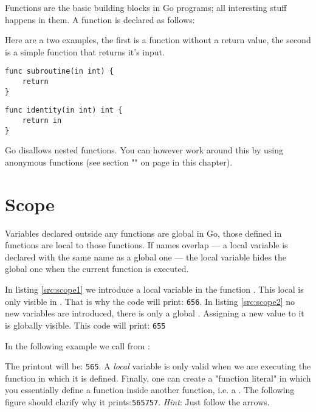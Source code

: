 
\noindent{}Functions are the basic building blocks in Go programs; all interesting
stuff happens in them. A function is declared as follows:

\showremarks
Here are a two examples, the first is a function without a return value,
the second is a simple function that returns it's input.
\begin{lstlisting}
func subroutine(in int) {
    return
}
\end{lstlisting}
\begin{lstlisting}
func identity(in int) int {
    return in
}
\end{lstlisting}
Go disallows nested functions.
You can however
work around this by using anonymous functions (see section
"" on page \pageref{sec:functions as values} 
in this chapter).

\section{Scope}
Variables declared outside any functions are global in Go, those
defined in functions are local to those functions. If names overlap --- a
local variable is declared with the same name as a global one --- the
local variable hides the global one when the current function is
executed.

\begin{minipage}{.5\textwidth}

\hfill
\vfill
\end{minipage}
\begin{minipage}{.5\textwidth}

\hfill
\vfill
\end{minipage}

In listing \ref{src:scope1} we introduce a local variable 
in the function .
This local  is only visible in . That is
why the code will print: \texttt{656}.
In listing \ref{src:scope2} no new variables are introduced, there
is only a global .
Assigning a new value to it is globally visible. This code will
print: \texttt{655}

In the following example we call  from :

The printout will be: \texttt{565}. A \emph{local} variable is only
valid when we are executing the function in which it is defined. 
Finally, one can create
a "function
literal" in which you essentially define a function inside another
function, i.e. a . 
The following figure should clarify why it
prints:\texttt{565757}. \emph{Hint}: Just follow the arrows.

